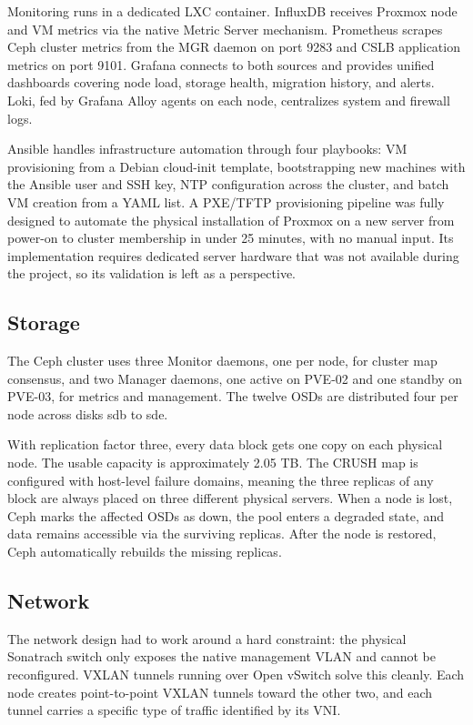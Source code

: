 \documentclass[12pt, a4paper]{article}
\begin{document}
Monitoring runs in a dedicated LXC container. InfluxDB receives Proxmox node and VM metrics via the native Metric Server mechanism. Prometheus scrapes Ceph cluster metrics from the MGR daemon on port 9283 and CSLB application metrics on port 9101. Grafana connects to both sources and provides unified dashboards covering node load, storage health, migration history, and alerts. Loki, fed by Grafana Alloy agents on each node, centralizes system and firewall logs.

Ansible handles infrastructure automation through four playbooks: VM provisioning from a Debian cloud-init template, bootstrapping new machines with the Ansible user and SSH key, NTP configuration across the cluster, and batch VM creation from a YAML list. A PXE/TFTP provisioning pipeline was fully designed to automate the physical installation of Proxmox on a new server from power-on to cluster membership in under 25 minutes, with no manual input. Its implementation requires dedicated server hardware that was not available during the project, so its validation is left as a perspective.

\subsection{Storage}

The Ceph cluster uses three Monitor daemons, one per node, for cluster map consensus, and two Manager daemons, one active on PVE-02 and one standby on PVE-03, for metrics and management. The twelve OSDs are distributed four per node across disks sdb to sde.

With replication factor three, every data block gets one copy on each physical node. The usable capacity is approximately 2.05 TB. The CRUSH map is configured with host-level failure domains, meaning the three replicas of any block are always placed on three different physical servers. When a node is lost, Ceph marks the affected OSDs as down, the pool enters a degraded state, and data remains accessible via the surviving replicas. After the node is restored, Ceph automatically rebuilds the missing replicas.

\subsection{Network}

The network design had to work around a hard constraint: the physical Sonatrach switch only exposes the native management VLAN and cannot be reconfigured. VXLAN tunnels running over Open vSwitch solve this cleanly. Each node creates point-to-point VXLAN tunnels toward the other two, and each tunnel carries a specific type of traffic identified by its VNI.
\end{document}
